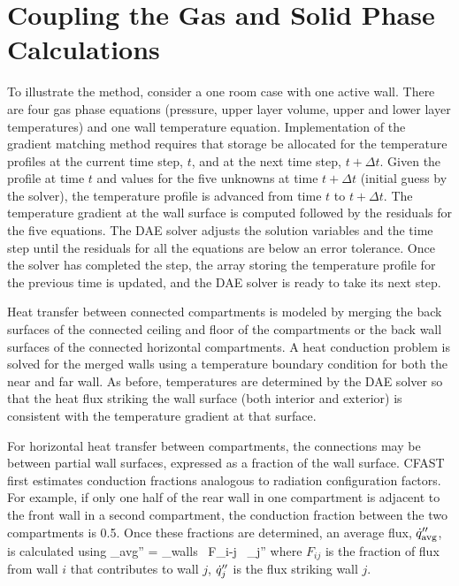 \section{Coupling the Gas and Solid Phase Calculations}

To illustrate the method, consider a one room case with one active wall.  There are four gas phase equations (pressure, upper layer volume, upper and lower layer temperatures) and one wall temperature equation.  Implementation of the gradient matching method requires that storage be allocated for the temperature profiles at the current time step, $t$, and at the next time step, $t + \Delta t$.  Given the profile at time $t$ and values for the five unknowns at time $t + \Delta t$ (initial guess by the solver), the temperature profile is advanced from time $t$ to $t + \Delta t$.  The temperature gradient at the wall surface is computed followed by the residuals for the five equations.  The DAE solver adjusts the solution variables and the time step until the residuals for all the equations are below an error tolerance.  Once the solver has completed the step, the array storing the temperature profile for the previous time is updated, and the DAE solver is ready to take its next step.

Heat transfer between connected compartments is modeled by merging the back surfaces of the connected ceiling and floor of the compartments or the back wall surfaces of the connected horizontal compartments.  A heat conduction problem is solved for the merged walls using a temperature boundary condition for both the near and far wall.  As before, temperatures are determined by the DAE solver so that the heat flux striking the wall surface (both interior and exterior) is consistent with the temperature gradient at that surface.

For horizontal heat transfer between compartments, the connections may be between partial wall surfaces, expressed as a fraction of the wall surface. CFAST first estimates conduction fractions analogous to radiation configuration factors. For example, if only one half of the rear wall in one compartment is adjacent to the front wall in a second compartment, the conduction fraction between the two compartments is 0.5. Once these fractions are determined, an average flux, $\dot{q}_{\rm avg}''$, is calculated using
\be
   \dq_{\rm avg}'' = \sum_{\rm walls} \, F_{i-j} \, \dq_j''
\ee
where $F_{ij}$ is the fraction of flux from wall $i$ that contributes to wall $j$, $\dot{q}_j''$ is the flux striking wall $j$.



